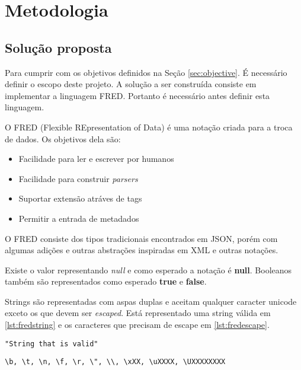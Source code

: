 \chapter[Metodologia]{Metodologia}

\section{Solução proposta}
\label{sec:solution}

Para cumprir com os objetivos definidos na Seção \ref{sec:objective}. É necessário definir
o escopo deste projeto. A solução a ser construída consiste em implementar a linguagem FRED.
Portanto é necessário antes definir esta linguagem.

O FRED (Flexible REpresentation of Data) é uma notação criada para a troca de dados. Os
objetivos dela são:

\begin{itemize}
    \item Facilidade para ler e escrever por humanos
    \item Facilidade para construir \textit{parsers}
    \item Suportar extensão atráves de tags
    \item Permitir a entrada de metadados
\end{itemize}

O FRED consiste dos tipos tradicionais encontrados em JSON, porém com algumas adições e outras abstrações
inspiradas em XML e outras notações.

Existe o valor representando \textit{null} e como esperado a notação é  \textbf{null}. Booleanos
também são representados como esperado \textbf{true} e \textbf{false}.

Strings são representadas com aspas duplas e aceitam qualquer caracter unicode 
exceto os que devem ser \textit{escaped}. Está representado uma string válida em \ref{lst:fredstring} 
e os caracteres que precisam de escape em \ref{lst:fredescape}.

\begin{lstlisting}[caption=Exemplo de String em FRED,label={lst:fredstring}]
"String that is valid"
\end{lstlisting}

\begin{lstlisting}[caption=Caracteres que devem ser escaped,label={lst:fredescape}]
\b, \t, \n, \f, \r, \", \\, \xXX, \uXXXX, \UXXXXXXXX
\end{lstlisting}

